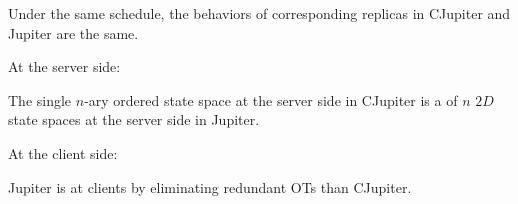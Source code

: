 \begin{frame}{}
  \begin{Theorem}
    Under the same schedule, the behaviors of corresponding replicas in CJupiter and Jupiter are the same.
  \end{Theorem}

  \vspace{0.30cm}
  \centerline{\large At the server side:}
  \begin{prop}
    The single $n$-ary ordered state space at the server side in CJupiter 
    is a  of $n$ $2D$ state spaces at the server side in Jupiter.
  \end{prop}

  \vspace{0.30cm}
  \centerline{\large At the client side:}
  \begin{prop}
    Jupiter is  at clients by eliminating redundant OTs than CJupiter.
  \end{prop}
\end{frame}
